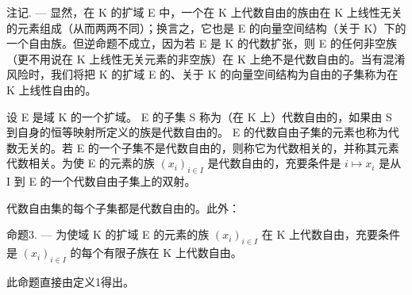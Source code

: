 注记. --- 显然，在 K 的扩域 E 中，一个在 K 上代数自由的族由在 K 上线性无关的元素组成（从而两两不同）；换言之，它也是 E 的向量空间结构（关于 K）下的一个自由族。但逆命题不成立，因为若 E 是 K 的代数扩张，则 E 的任何非空族（更不用说在 K 上线性无关元素的非空族）在 K 上绝不是代数自由的。当有混淆风险时，我们将把 K 的扩域 E 的、关于 K 的向量空间结构为自由的子集称为在 K 上线性自由的。

设 E 是域 K 的一个扩域。 E 的子集 S 称为（在 K 上）代数自由的，如果由 S 到自身的恒等映射所定义的族是代数自由的。 E 的代数自由子集的元素也称为代数无关的。若 E 的一个子集不是代数自由的，则称它为代数相关的，并称其元素代数相关。为使 E 的元素的族 \((x_{i})_{i\in I}\) 是代数自由的，充要条件是 \(i\mapsto x_{i}\) 是从 I 到 E 的一个代数自由子集上的双射。

代数自由集的每个子集都是代数自由的。此外：

命题3. --- 为使域 K 的扩域 E 的元素的族 \((x_{i})_{i\in I}\) 在 K 上代数自由，充要条件是 \((x_{i})_{i\in I}\) 的每个有限子族在 K 上代数自由。

此命题直接由定义1得出。

